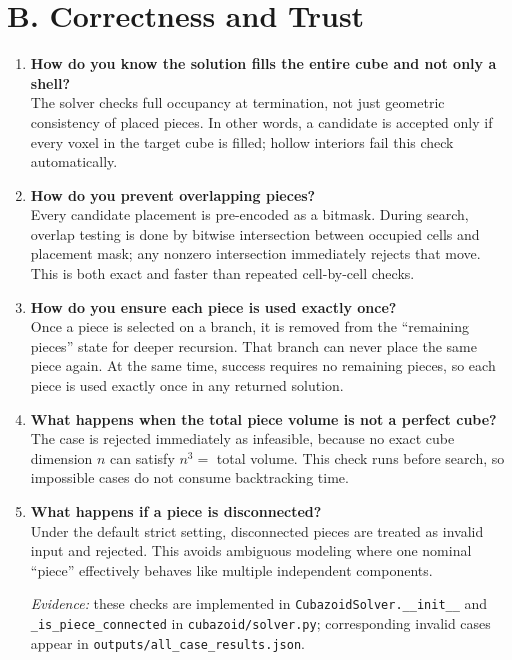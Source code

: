 \documentclass[11pt]{article}
\begin{document}
\section*{B. Correctness and Trust}
\begin{enumerate}[leftmargin=*,label=\textbf{Q\arabic*.},start=5]
\item \textbf{How do you know the solution fills the entire cube and not only a shell?}\\
The solver checks full occupancy at termination, not just geometric consistency of placed pieces. In other words, a candidate is accepted only if every voxel in the target cube is filled; hollow interiors fail this check automatically.

\item \textbf{How do you prevent overlapping pieces?}\\
Every candidate placement is pre-encoded as a bitmask. During search, overlap testing is done by bitwise intersection between occupied cells and placement mask; any nonzero intersection immediately rejects that move. This is both exact and faster than repeated cell-by-cell checks.

\item \textbf{How do you ensure each piece is used exactly once?}\\
Once a piece is selected on a branch, it is removed from the ``remaining pieces'' state for deeper recursion. That branch can never place the same piece again. At the same time, success requires no remaining pieces, so each piece is used exactly once in any returned solution.

\item \textbf{What happens when the total piece volume is not a perfect cube?}\\
The case is rejected immediately as infeasible, because no exact cube dimension \(n\) can satisfy \(n^3=\) total volume. This check runs before search, so impossible cases do not consume backtracking time.

\item \textbf{What happens if a piece is disconnected?}\\
Under the default strict setting, disconnected pieces are treated as invalid input and rejected. This avoids ambiguous modeling where one nominal ``piece'' effectively behaves like multiple independent components.

\textit{Evidence:} these checks are implemented in \texttt{CubazoidSolver.\_\_init\_\_} and \texttt{\_is\_piece\_connected} in \texttt{cubazoid/solver.py}; corresponding invalid cases appear in \texttt{outputs/all\_case\_results.json}.
\end{enumerate}
\end{document}
